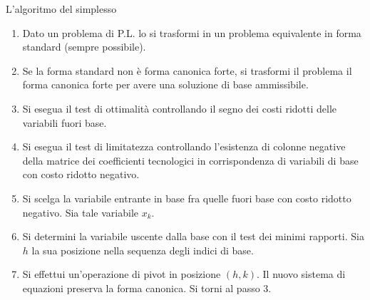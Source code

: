 \documentclass{beamer}
\begin{document}
\begin{frame}[allowframebreaks]{L'algoritmo del simplesso}
\begin{enumerate}
\item Dato un problema di P.L. lo si trasformi in un problema
	equivalente in forma standard (sempre possibile).

\item Se la forma standard non \`e forma canonica forte, si
	trasformi il problema il forma canonica forte per avere una
	soluzione di base ammissibile.

\item Si esegua il test di ottimalit\`a controllando il segno dei
	costi ridotti delle variabili fuori base.
	
\item Si esegua il test di limitatezza controllando l'esistenza di
	colonne negative della matrice dei coefficienti tecnologici
	in corrispondenza di variabili di base con costo ridotto negativo.


\item Si scelga la variabile entrante in base fra quelle fuori base
	con costo ridotto negativo. Sia tale variabile $x_k$.

\item Si determini la variabile uscente dalla base con il test dei
	minimi rapporti. Sia $h$ la sua posizione nella sequenza degli
	indici di base.

\item Si effettui un'operazione di pivot in posizione $(h, k)$.
	Il nuovo sistema di equazioni preserva la forma canonica.
	Si torni al passo 3.
\end{enumerate}
\end{frame}
\end{document}
